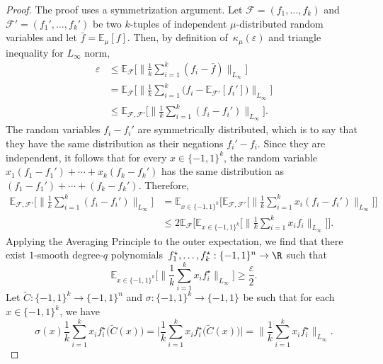 \documentclass{toc}
\newcommand{\pmset}[1]{\{-1,1\}^{#1}} %
\newcommand{\sBC}{{\{-1,1\}}}
\newcommand{\Exp}{{\mathbb{E}}}
\newcommand{\E}{\mathbb{E}}
\newcommand{\eps}{\varepsilon}
\newcommand{\beq}{\begin{equation}}
\newcommand{\eeq}{\end{equation}}
\begin{document}
\begin{proof}
The proof uses a symmetrization argument.
Let $\mathcal F = (f_1,\dots,f_k)$ and $\mathcal F' = (f_1',\dots,f_k')$ be two $k$-tuples of independent $\mu$-distributed random variables and let $\bar f = \Exp_\mu[f]$.
Then, by definition of~$\kappa_\mu(\eps)$ and triangle inequality for $L_\infty$ norm,
\begin{align*}
\eps 
&\le 
\E_{\mathcal F}\Big[\Big\|\frac{1}{k}\sum_{i=1}^k (f_i - \bar f)\Big\|_{L_\infty}\Big]\\
&=
\E_{\mathcal F}\Big[\Big\|\frac{1}{k}\sum_{i=1}^k \big(f_i - \Exp_{\mathcal F'}[f_i']\big)\Big\|_{L_\infty}\Big]\\
&\le 
\E_{\mathcal{F,F'}}\Big[\Big\|\frac{1}{k}\sum_{i=1}^k (f_i - f_i')\Big\|_{L_{\infty}}\Big].
\end{align*}
The random variables $f_i - f_i'$ are symmetrically distributed, which is to say that they have the same distribution as their negations $f_i' - f_i$.
Since they are independent, it follows that
for every $x\in\pmset{k}$, the random variable $x_1(f_1 - f_1') + \cdots + x_k(f_k - f_k')$ has the same distribution as $(f_1 - f_1') + \cdots + (f_k - f_k')$.
Therefore,
\begin{align*}
\E_{\mathcal{F,F'}}\Big[\Big\|\frac{1}{k}\sum_{i=1}^k (f_i - f_i')\Big\|_{L_{\infty}}\Big]
&= 
\E_{x\in \sBC^k}\Big[\E_{\mathcal{F,F'}}\Big[\Big\|\frac{1}{k}\sum_{i=1}^k x_i(f_i - f_i')\Big\|_{L_{\infty}}\Big]\Big]\\
&\le
2\E_{\mathcal{F}}\Big[\E_{x\in \sBC^k}\Big[\Big\|\frac{1}{k}\sum_{i=1}^k x_if_i\Big\|_{L_{\infty}}\Big]\Big].
\end{align*}
Applying the Averaging Principle to the outer expectation, we find that there exist $1$-smooth degree-$q$ polynomials~$f_1^\star,\dots,f_k^\star:\pmset{n}\to\R$ such that 
\beq\label{eq:fstareps}
\E_{x\in \sBC^k}\Big[\Big\|\frac{1}{k}\sum_{i=1}^k x_if_i^\star\Big\|_{L_\infty}\Big]
\ge \frac{\eps}{2}.
\eeq
Let $\tilde C:\sBC^k\to \sBC^n$ and $\sigma:\pmset{k}\to\pmset{}$ be such that for each $x\in\pmset{k}$, we have
\beq\label{eq:Cdef}
\sigma(x)\frac{1}{k}\sum_{i=1}^k x_if_i^\star\big(\tilde C(x)\big)
=
\Big|
\frac{1}{k}\sum_{i=1}^k x_if_i^\star\big(\tilde C(x)\big)
\Big|
=
\Big\|\frac{1}{k}\sum_{i=1}^k x_if_i^\star\Big\|_{L_{\infty}}.
\eeq


\end{proof}
\end{document}
